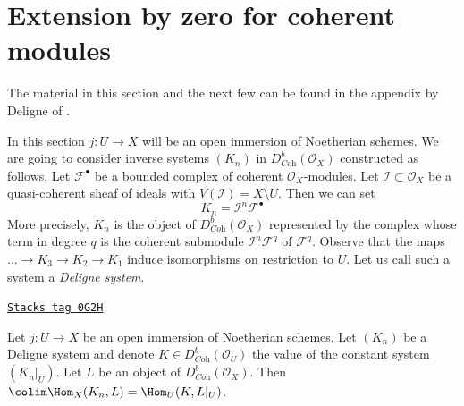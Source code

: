 \section{Extension by zero for coherent modules}
\label{duality-section-extension-by-zero}
The material in this section and the next few can be found
in the appendix by Deligne of \cite{RD}.

\medskip\noindent
In this section $j : U \to X$ will be an open immersion of Noetherian schemes.
We are going to consider inverse systems $(K_n)$ in
$D^b_{\textit{Coh}}(\mathcal{O}_X)$ constructed as follows.
Let $\mathcal{F}^\bullet$ be a bounded complex of coherent
$\mathcal{O}_X$-modules. Let $\mathcal{I} \subset \mathcal{O}_X$
be a quasi-coherent sheaf of ideals with $V(\mathcal{I}) = X \setminus U$.
Then we can set
$$
K_n = \mathcal{I}^n\mathcal{F}^\bullet
$$
More precisely, $K_n$ is the object of $D^b_{\textit{Coh}}(\mathcal{O}_X)$
represented by the complex whose term in degree $q$
is the coherent submodule $\mathcal{I}^n\mathcal{F}^q$ of $\mathcal{F}^q$.
Observe that the maps $\ldots \to K_3 \to K_2 \to K_1$ induce isomorphisms
on restriction to $U$. Let us call such a system a {\it Deligne system}.

\begin{lemma}
\label{duality-lemma-lift-map}
\href{https://stacks.math.columbia.edu/tag/0G2H}{\texttt{Stacks tag 0G2H}}

Let $j : U \to X$ be an open immersion of Noetherian schemes.
Let $(K_n)$ be a Deligne system and denote
$K \in D^b_{\textit{Coh}}(\mathcal{O}_U)$ the value
of the constant system $(K_n|_U)$. Let $L$ be an object of
$D^b_{\textit{Coh}}(\mathcal{O}_X)$.
Then $\colim \Hom_X(K_n, L) = \Hom_U(K, L|_U)$.
\end{lemma}

